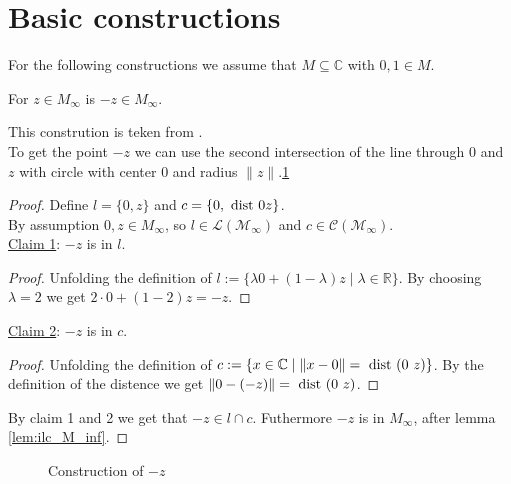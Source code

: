 \section{Basic constructions}\label{basic_constructions}
For the following constructions we assume that $M\subseteq \mathbb{C}$ with $0,1 \in M$.

\begin{lemma}
    \label{lem:construction_neg}
    \leanok
    For $z \in M_{\infty}$ is $-z \in M_{\infty}$.
\end{lemma}
This constrution is teken from \cite{JAN_SCHRÖER:2023}.\\
To get the point $-z$ we can use the second intersection of the line through $0$ and $z$ with circle with center $0$ and radius $\|z\|$.\ref{Fig.1}

\begin{proof}
    Define $l = \{0,z\}$ and $c = \{0,\text{ dist } 0 z\}$.\\
    By assumption $0, z \in M_{\infty}$, so $l \in \mathcal{L(M_{\infty})}$ and $c \in \mathcal{C(M_{\infty})}$.\\
    \underline{Claim 1}: $-z$ is in $l$.
    \begin{proof}
        Unfolding the definition of $l:=\{\lambda 0+(1-\lambda)z\mid\lambda\in\mathbb{R}\}$.
        By choosing $\lambda = 2$ we get $2 \cdot 0 + (1-2)z = -z$.
    \end{proof}
    \underline{Claim 2}: $-z$ is in $c$.
    \begin{proof}
        Unfolding the definition of $c:=\{x\in\mathbb{C} \mid\|x-0\|=\dist (0\ z)\}$.
        By the definition of the distence we get $\|0-(-z)\| = \text{ dist } (0\ z)$.
    \end{proof}
    By claim 1 and 2 we get that $-z \in l \cap c$. Futhermore  $-z $ is in $M_{\infty}$, after lemma \ref{lem:ilc_M_inf}.
\end{proof}

\begin{figure}[h!]
    \centering
    \caption{Construction of $-z$}
    \label{Fig.1}
\end{figure}

